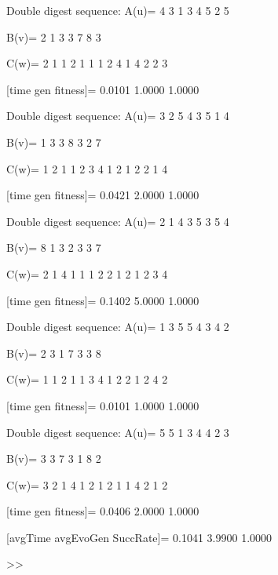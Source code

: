 Double digest sequence:
A(u)=
     4     3     1     3     4     5     2     5

B(v)=
     2     1     3     3     7     8     3

C(w)=
     2     1     1     2     1     1     1     2     4     1     4     2     2     3

[time gen fitness]=
    0.0101    1.0000    1.0000

Double digest sequence:
A(u)=
     3     2     5     4     3     5     1     4

B(v)=
     1     3     3     8     3     2     7

C(w)=
     1     2     1     1     2     3     4     1     2     1     2     2     1     4

[time gen fitness]=
    0.0421    2.0000    1.0000

Double digest sequence:
A(u)=
     2     1     4     3     5     3     5     4

B(v)=
     8     1     3     2     3     3     7

C(w)=
     2     1     4     1     1     1     2     2     1     2     1     2     3     4

[time gen fitness]=
    0.1402    5.0000    1.0000

Double digest sequence:
A(u)=
     1     3     5     5     4     3     4     2

B(v)=
     2     3     1     7     3     3     8

C(w)=
     1     1     2     1     1     3     4     1     2     2     1     2     4     2

[time gen fitness]=
    0.0101    1.0000    1.0000

Double digest sequence:
A(u)=
     5     5     1     3     4     4     2     3

B(v)=
     3     3     7     3     1     8     2

C(w)=
     3     2     1     4     1     2     1     2     1     1     4     2     1     2

[time gen fitness]=
    0.0406    2.0000    1.0000

[avgTime  avgEvoGen  SuccRate]=
    0.1041    3.9900    1.0000

>> 